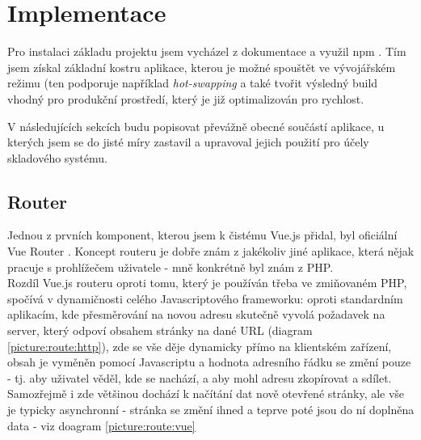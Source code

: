 \chapter{Implementace}\label{implementation}

Pro instalaci základu projektu jsem vycházel z dokumentace \cite{vue-doc} a využil npm \cite{npm}. Tím jsem získal základní kostru aplikace, kterou je možné spouštět ve vývojářském režimu (ten podporuje například \emph{hot-swapping} a také tvořit výsledný build vhodný pro produkční prostředí, který je již optimalizován pro rychlost.

V následujících sekcích budu popisovat převážně obecné součástí aplikace, u kterých jsem se do jisté míry zastavil a upravoval jejich použití pro účely skladového systému.


\section{Router}

Jednou z prvních komponent, kterou jsem k čistému Vue.js přidal, byl oficiální Vue Router \cite{vue-router}. Koncept routeru je dobře znám z jakékoliv jiné aplikace, která nějak pracuje s prohlížečem uživatele - mně konkrétně byl znám z PHP.\\
Rozdíl Vue.js routeru oproti tomu, který je používán třeba ve zmiňovaném PHP, spočívá v dynamičnosti celého Javascriptového frameworku: oproti standardním aplikacím, kde přesměrování na novou adresu skutečně vyvolá požadavek na server, který odpoví obsahem stránky na dané URL (diagram \ref{picture:route:http}), zde se vše děje dynamicky přímo na klientském zařízení, obsah je vyměněn pomocí Javascriptu a hodnota adresního řádku se změní pouze  - tj. aby uživatel věděl, kde se nachází, a aby mohl adresu zkopírovat a sdílet. Samozřejmě i zde většinou dochází k načítání dat nově otevřené stránky, ale vše je typicky asynchronní - stránka se změní ihned a teprve poté jsou do ní doplněna data - viz doagram \ref{picture:route:vue}

